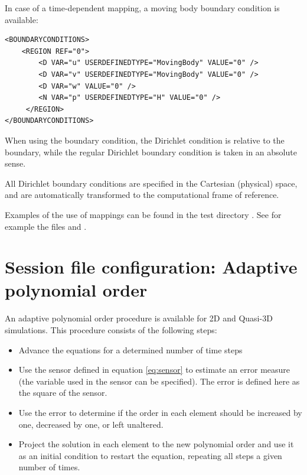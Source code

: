 In case of a time-dependent mapping, a moving body boundary condition
is available: 
\begin{lstlisting}[style=XMLStyle]
<BOUNDARYCONDITIONS>
    <REGION REF="0">
        <D VAR="u" USERDEFINEDTYPE="MovingBody" VALUE="0" />
        <D VAR="v" USERDEFINEDTYPE="MovingBody" VALUE="0" />
        <D VAR="w" VALUE="0" />
        <N VAR="p" USERDEFINEDTYPE="H" VALUE="0" />
     </REGION>
</BOUNDARYCONDITIONS>
\end{lstlisting}
When using the  boundary condition, the Dirichlet condition
is relative to the boundary, while the regular Dirichlet boundary condition
is taken in an absolute sense. 

All Dirichlet boundary conditions are specified in the Cartesian (physical) space,
 and are automatically transformed to the computational frame of reference. 
 
\begin{notebox}
Examples of the use of mappings can be found in the test directory
. See for example the files
 and .
\end{notebox}

\section{Session file configuration: Adaptive polynomial order}
\label{SectionDriverAdaptive}

An adaptive polynomial order procedure is available for 2D and
Quasi-3D simulations.  This procedure consists of the following steps:
\begin{itemize}
\item Advance the equations for a determined number of time steps
\item Use the sensor defined in equation \ref{eq:sensor} to 
estimate an error measure (the variable used in the sensor can be specified).
 The error is defined here as the square of the sensor.  
\item Use the error to determine if the order in each element should be
increased by one, decreased by one, or left unaltered.
\item Project the solution in each element to the new polynomial order and use it as an
initial condition to restart the equation, repeating all steps a given number of times.
\end{itemize}

